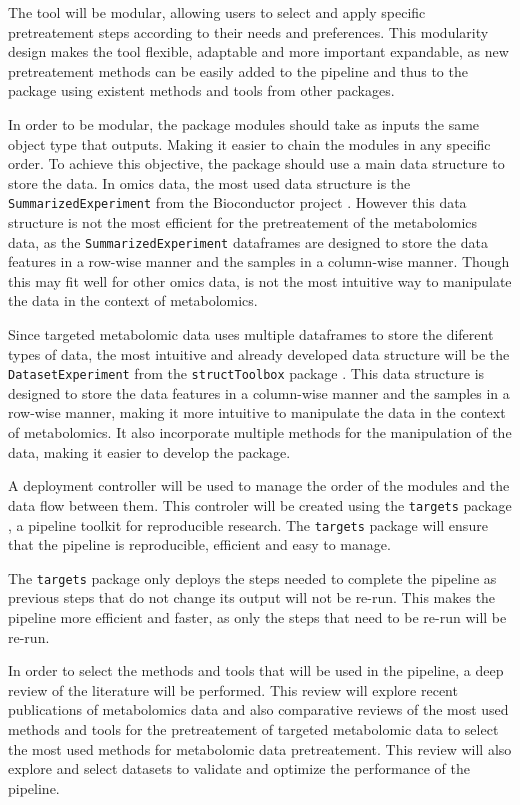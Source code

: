 \documentclass[ENG, BIB]{TFUOC}%
\begin{document}
The tool will be modular, allowing users to select and apply specific pretreatement steps according to their needs and preferences. This modularity design makes the tool flexible, adaptable and more important expandable, as new pretreatement methods can be easily added to the pipeline and thus to the package using existent methods and tools from other packages.

In order to be modular, the package modules should take as inputs the same object type that outputs. Making it easier to chain the modules in any specific order. To achieve this objective, the package should use a main data structure to store the data. In omics data, the most used data structure is the \texttt{SummarizedExperiment} from the Bioconductor project \cite{R-SummarizedExperiment}. However this data structure is not the most efficient for the pretreatement of the metabolomics data, as the \texttt{SummarizedExperiment} dataframes are designed to store the data features in a row-wise manner and the samples in a column-wise manner. Though this may fit well for other omics data, is not the most intuitive way to manipulate the data in the context of metabolomics.

Since targeted metabolomic data uses multiple dataframes to store the diferent types of data, the most intuitive and already developed data structure will be the \texttt{DatasetExperiment} from the \texttt{structToolbox} package \cite{structToolbox2020}. This data structure is designed to store the data features in a column-wise manner and the samples in a row-wise manner, making it more intuitive to manipulate the data in the context of metabolomics. It also incorporate multiple methods for the manipulation of the data, making it easier to develop the package.

A deployment controller will be used to manage the order of the modules and the data flow between them. This controler will be created using the \texttt{targets} package \cite{targets2021}, a pipeline toolkit for reproducible research. The \texttt{targets} package will ensure that the pipeline is reproducible, efficient and easy to manage.

The \texttt{targets} package only deploys the steps needed to complete the pipeline as previous steps that do not change its output will not be re-run. This makes the pipeline more efficient and faster, as only the steps that need to be re-run will be re-run.

In order to select the methods and tools that will be used in the pipeline, a deep review of the literature will be performed. This review will explore recent publications of metabolomics data and also comparative reviews of the most used methods and tools for the pretreatement of targeted metabolomic data to select the most used methods for metabolomic data pretreatement. This review will also explore and select datasets to validate and optimize the performance of the pipeline.
\end{document}
